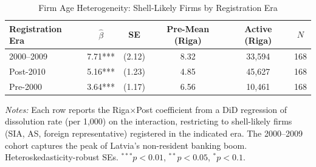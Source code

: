 \begin{table}[t]
\centering
\caption{Firm Age Heterogeneity: Shell-Likely Firms by Registration Era}
\label{tab:age_het}
\begin{tabular}{lccccc}
\hline\hline
Registration Era & $\hat{\beta}$ & SE & Pre-Mean (Riga) & Active (Riga) & $N$ \\
\hline
2000--2009 & 7.71*** & (2.12) & 8.32 & 33,594 & 168 \\
Post-2010 & 5.16*** & (1.23) & 4.85 & 45,627 & 168 \\
Pre-2000 & 3.64*** & (1.17) & 6.56 & 10,461 & 168 \\
\hline\hline
\end{tabular}
\begin{tablenotes}[flushleft]
\small
\item \textit{Notes:} Each row reports the Riga$\times$Post coefficient from a DiD regression of dissolution rate (per 1,000) on the interaction, restricting to shell-likely firms (SIA, AS, foreign representative) registered in the indicated era. The 2000--2009 cohort captures the peak of Latvia's non-resident banking boom. Heteroskedasticity-robust SEs. $^{***}p<0.01$, $^{**}p<0.05$, $^{*}p<0.1$.
\end{tablenotes}
\end{table}

